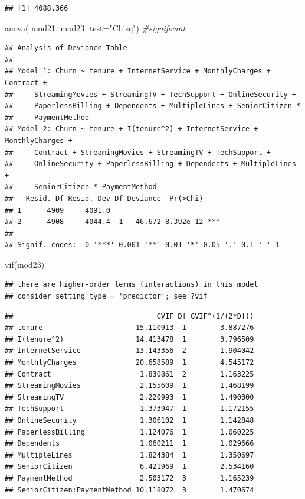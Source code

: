 \documentclass[
  twoside]{article}
\newenvironment{Shaded}{\begin{snugshade}}{\end{snugshade}}
\newcommand{\AttributeTok}[1]{\textcolor[rgb]{0.77,0.63,0.00}{#1}}
\newcommand{\CommentTok}[1]{\textcolor[rgb]{0.56,0.35,0.01}{\textit{#1}}}
\newcommand{\FunctionTok}[1]{\textcolor[rgb]{0.00,0.00,0.00}{#1}}
\newcommand{\NormalTok}[1]{#1}
\newcommand{\StringTok}[1]{\textcolor[rgb]{0.31,0.60,0.02}{#1}}
\begin{document}
\begin{verbatim}
## [1] 4088.366
\end{verbatim}

\begin{Shaded}
\begin{Highlighting}[]
\FunctionTok{anova}\NormalTok{( mod21, mod23,  }\AttributeTok{test=}\StringTok{"Chisq"}\NormalTok{) }\CommentTok{\#significant}
\end{Highlighting}
\end{Shaded}

\begin{verbatim}
## Analysis of Deviance Table
## 
## Model 1: Churn ~ tenure + InternetService + MonthlyCharges + Contract + 
##     StreamingMovies + StreamingTV + TechSupport + OnlineSecurity + 
##     PaperlessBilling + Dependents + MultipleLines + SeniorCitizen * 
##     PaymentMethod
## Model 2: Churn ~ tenure + I(tenure^2) + InternetService + MonthlyCharges + 
##     Contract + StreamingMovies + StreamingTV + TechSupport + 
##     OnlineSecurity + PaperlessBilling + Dependents + MultipleLines + 
##     SeniorCitizen * PaymentMethod
##   Resid. Df Resid. Dev Df Deviance  Pr(>Chi)    
## 1      4909     4091.0                          
## 2      4908     4044.4  1   46.672 8.392e-12 ***
## ---
## Signif. codes:  0 '***' 0.001 '**' 0.01 '*' 0.05 '.' 0.1 ' ' 1
\end{verbatim}

\begin{Shaded}
\begin{Highlighting}[]
\FunctionTok{vif}\NormalTok{(mod23)}
\end{Highlighting}
\end{Shaded}

\begin{verbatim}
## there are higher-order terms (interactions) in this model
## consider setting type = 'predictor'; see ?vif
\end{verbatim}

\begin{verbatim}
##                                  GVIF Df GVIF^(1/(2*Df))
## tenure                      15.110913  1        3.887276
## I(tenure^2)                 14.413478  1        3.796509
## InternetService             13.143356  2        1.904042
## MonthlyCharges              20.658589  1        4.545172
## Contract                     1.830861  2        1.163225
## StreamingMovies              2.155609  1        1.468199
## StreamingTV                  2.220993  1        1.490300
## TechSupport                  1.373947  1        1.172155
## OnlineSecurity               1.306102  1        1.142848
## PaperlessBilling             1.124076  1        1.060225
## Dependents                   1.060211  1        1.029666
## MultipleLines                1.824384  1        1.350697
## SeniorCitizen                6.421969  1        2.534160
## PaymentMethod                2.503172  3        1.165239
## SeniorCitizen:PaymentMethod 10.118072  3        1.470674
\end{verbatim}
\end{document}
